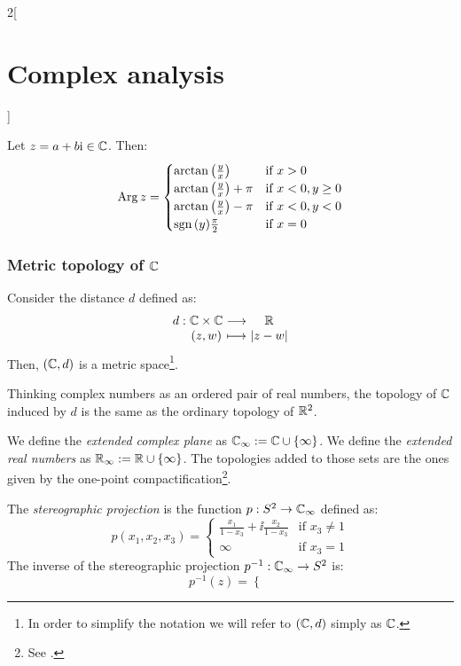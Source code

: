 \documentclass[../../../main_math.tex]{subfiles}
\begin{document}
\begin{multicols}{2}[\section{Complex analysis}]
\begin{definition}
  \end{definition}
  \begin{proposition}
    Let $z=a+b\ii\in\CC$. Then:
    $$\Arg z=
      \begin{cases}
        \arctan\left(\frac{y}{x}\right)     & \text{if }x>0         \\
        \arctan\left(\frac{y}{x}\right)+\pi & \text{if }x<0,y\geq 0 \\
        \arctan\left(\frac{y}{x}\right)-\pi & \text{if }x<0,y<0     \\
        \sign{(y)}\frac{\pi}{2}             & \text{if }x=0
      \end{cases}
    $$
  \end{proposition}
  \subsubsection{Metric topology of \texorpdfstring{$\CC$}{C}}
  \begin{proposition}
    Consider the distance $d$ defined as: $$\function{d}{\CC\times\CC}{\RR}{(z,w)}{\abs{z-w}}$$ Then, $(\CC,d)$ is a metric space\footnote{In order to simplify the notation we will refer to $(\CC,d)$ simply as $\CC$.}.
  \end{proposition}
  \begin{proposition}
    Thinking complex numbers as an ordered pair of real numbers, the topology of $\CC$ induced by $d$ is the same as the ordinary topology of $\RR^2$.
  \end{proposition}
  \begin{definition}
    We define the \emph{extended complex plane} as $\CC_\infty:=\CC\cup\{\infty\}$. We define the \emph{extended real numbers} as $\RR_\infty:=\RR\cup\{\infty\}$. The topologies added to those sets are the ones given by the one-point compactification\footnote{See .}.
  \end{definition}
  \begin{definition}
    The \emph{stereographic projection} is the function $p:\S^2\rightarrow\CC_\infty$ defined as:
    $$p(x_1,x_2,x_3)=
      \begin{cases}
        \frac{x_1}{1-x_3}+\ii\frac{x_2}{1-x_3} & \text{if }x_3\ne 1 \\
        \infty                                 & \text{if }x_3= 1
      \end{cases}$$
    The inverse of the stereographic projection $p^{-1}:\CC_\infty\rightarrow \S^2$ is:
    $$p^{-1}(z)=
      \begin{cases}

\end{cases}$$
\end{definition}
\end{multicols}
\end{document}
